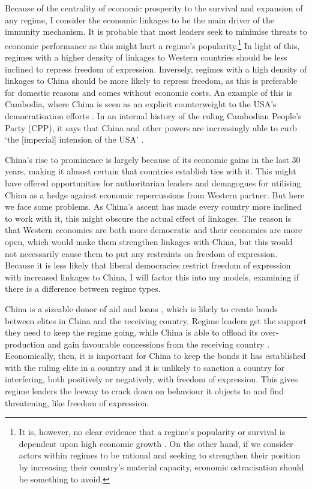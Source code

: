 Because of the centrality of economic prosperity to the survival and expansion of any regime, I consider the economic linkages to be the main driver of the immunity mechanism. It is probable that most leaders seek to minimise threats to economic performance as this might hurt a regime's popularity.\footnote{It is, however, no clear evidence that a regime's popularity or survival is dependent upon high economic growth \citep{chu_sources_2013, stockemer_economic_2020}. On the other hand, if we consider actors within regimes to be rational and seeking to strengthen their position by increasing their country's material capacity, economic ostracisation should be something to avoid.} In light of this, regimes with a higher density of linkages to Western countries should be less inclined to repress freedom of expression. Inversely, regimes with a high density of linkages to China should be more likely to repress freedom, as this is preferable for domestic reasons and comes without economic costs. An example of this is Cambodia, where China is seen as an explicit counterweight to the USA's democratisation efforts \citep[pp. 7-8]{loughlin_chinese_2021}. In an internal history of the ruling Cambodian People's Party (CPP), it says that China and other powers are increasingly able to curb `the [imperial] intension of the USA' \citep{loughlin_chinese_2021}.

China's rise to prominence is largely because of its economic gains in the last 30 years, making it almost certain that countries establish ties with it. This might have offered opportunities for authoritarian leaders and demagogues for utilising China as a hedge against economic repercussions from Western partner. But here we face some problems. As China's ascent has made every country more inclined to work with it, this might obscure the actual effect of linkages. The reason is that Western economies are both more democratic and their economies are more open, which would make them strengthen linkages with China, but this would not necessarily cause them to put any restraints on freedom of expression. Because it is less likely that liberal democracies restrict freedom of expression with increased linkages to China, I will factor this into my models, examining if there is a difference between regime types.

China is a sizeable donor of aid and loans \citep{fuchs_why_2022}, which is likely to create bonds between elites in China and the receiving country. Regime leaders get the support they need to keep the regime going, while China is able to offload its over-production and gain favourable concessions from the receiving country \citep{fuchs_why_2022}. Economically, then, it is important for China to keep the bonds it has established with the ruling elite in a country and it is unlikely to sanction a country for interfering, both positively or negatively, with freedom of expression. This gives regime leaders the leeway to crack down on behaviour it objects to and find threatening, like freedom of expression.

